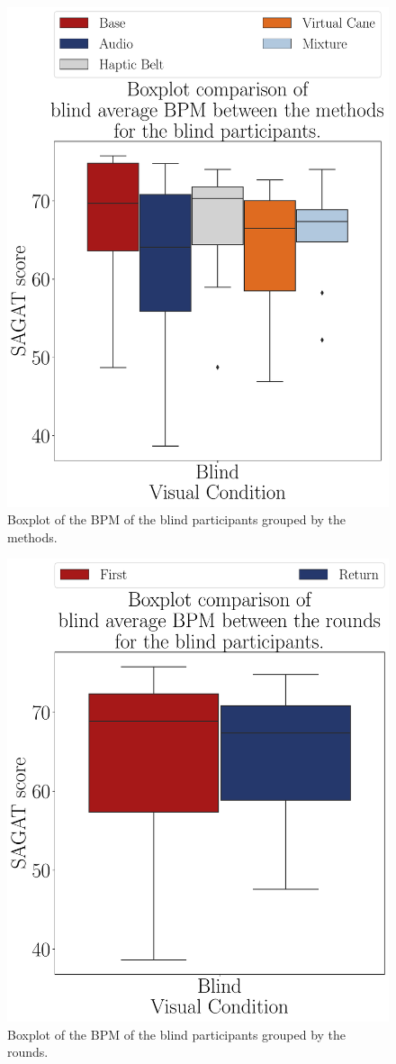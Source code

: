 \begin{figure}[!htb]
    \centering
    \includegraphics[width = 0.75\linewidth]{3 - Resultados/Figuras/boxplot_ecg_bpm_blind_scene.pdf}
    \caption{Boxplot of the BPM of the blind participants grouped by the methods.}
    \label{fig:boxplot_ecg_bpm_blind_scene}
\end{figure}

\begin{figure}[!htb]
    \centering
    \includegraphics[width = 0.75\linewidth]{3 - Resultados/Figuras/boxplot_ecg_bpm_blind_rounds.pdf}
    \caption{Boxplot of the BPM of the blind participants grouped by the rounds.}
    \label{fig:boxplot_ecg_bpm_blind_rounds}
\end{figure}


